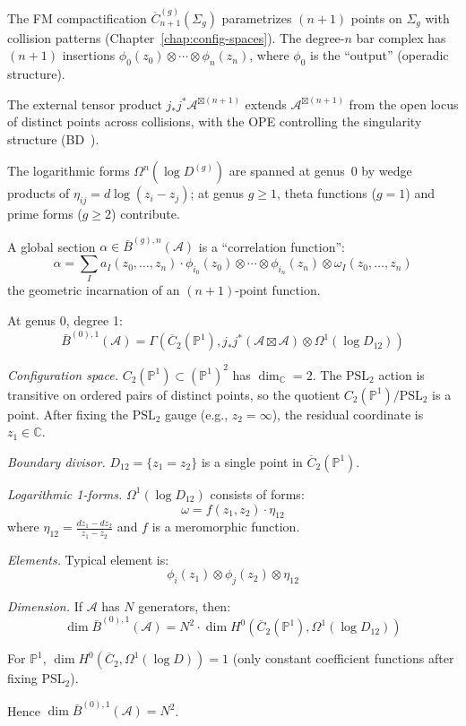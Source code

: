\begin{remark}\label{rem:unpacking-bar-def}
The FM compactification $\overline{C}_{n+1}^{(g)}(\Sigma_g)$ parametrizes $(n+1)$ points on $\Sigma_g$ with collision patterns (Chapter~\ref{chap:config-spaces}).  The degree-$n$ bar complex has $(n+1)$ insertions $\phi_0(z_0) \otimes \cdots \otimes \phi_n(z_n)$, where $\phi_0$ is the ``output'' (operadic structure).

The external tensor product $j_*j^*\mathcal{A}^{\boxtimes(n+1)}$ extends $\mathcal{A}^{\boxtimes(n+1)}$ from the open locus of distinct points across collisions, with the OPE controlling the singularity structure (BD~\cite[\S3.4.14--3.4.22]{BD04}).

The logarithmic forms $\Omega^n(\log D^{(g)})$ are spanned at genus~$0$ by wedge products of $\eta_{ij} = d\log(z_i - z_j)$; at genus $g \geq 1$, theta functions ($g=1$) and prime forms ($g \geq 2$) contribute.

A global section $\alpha \in \bar{B}^{(g),n}(\mathcal{A})$ is a ``correlation function'':
\[\alpha = \sum_I a_I(z_0, \ldots, z_n) \cdot \phi_{i_0}(z_0) \otimes \cdots \otimes \phi_{i_n}(z_n) \otimes \omega_I(z_0, \ldots, z_n)\]
the geometric incarnation of an $(n+1)$-point function.
\end{remark}

\begin{example}\label{ex:bar-genus0-deg1}
At genus 0, degree 1:
\[\bar{B}^{(0),1}(\mathcal{A}) = \Gamma\left(\overline{C}_2(\mathbb{P}^1), j_*j^*(\mathcal{A} \boxtimes \mathcal{A}) \otimes \Omega^1(\log D_{12})\right)\]

\emph{Configuration space.} $C_2(\mathbb{P}^1) \subset (\mathbb{P}^1)^2$ has $\dim_\mathbb{C} = 2$.  The $\text{PSL}_2$ action is transitive on ordered pairs of distinct points, so the quotient $C_2(\mathbb{P}^1)/\text{PSL}_2$ is a point.  After fixing the $\text{PSL}_2$ gauge (e.g., $z_2 = \infty$), the residual coordinate is $z_1 \in \mathbb{C}$.

\emph{Boundary divisor.} $D_{12} = \{z_1 = z_2\}$ is a single point in $\overline{C}_2(\mathbb{P}^1)$.

\emph{Logarithmic 1-forms.} $\Omega^1(\log D_{12})$ consists of forms:
\[\omega = f(z_1, z_2) \cdot \eta_{12}\]
where $\eta_{12} = \frac{dz_1 - dz_2}{z_1 - z_2}$ and $f$ is a meromorphic function.

\emph{Elements.} Typical element is:
\[\phi_i(z_1) \otimes \phi_j(z_2) \otimes \eta_{12}\]

\emph{Dimension.} If $\mathcal{A}$ has $N$ generators, then:
\[\dim \bar{B}^{(0),1}(\mathcal{A}) = N^2 \cdot \dim H^0(\overline{C}_2(\mathbb{P}^1), \Omega^1(\log D_{12}))\]

For $\mathbb{P}^1$, $\dim H^0(\overline{C}_2, \Omega^1(\log D)) = 1$ (only constant coefficient functions after fixing $\text{PSL}_2$).

Hence $\dim \bar{B}^{(0),1}(\mathcal{A}) = N^2$.
\end{example}

